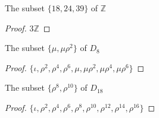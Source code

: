 \begin{exercise}
    The subset $\{ 18, 24, 39 \}$ of $\mathbb{Z}$
\end{exercise}

\begin{proof}
    $3\mathbb{Z}$
\end{proof}

\begin{exercise}
    The subset $\{ \mu, \mu\rho^{2} \}$ of $D_{8}$
\end{exercise}

\begin{proof}
    $\{ \iota, \rho^{2}, \rho^{4}, \rho^{6}, \mu, \mu\rho^{2}, \mu\rho^{4}, \mu\rho^{6} \}$
\end{proof}

\begin{exercise}
    The subset $\{ \rho^{8}, \rho^{10} \}$ of $D_{18}$
\end{exercise}

\begin{proof}
    $\{ \iota, \rho^{2}, \rho^{4}, \rho^{6}, \rho^{8}, \rho^{10}, \rho^{12}, \rho^{14}, \rho^{16} \}$
\end{proof}

